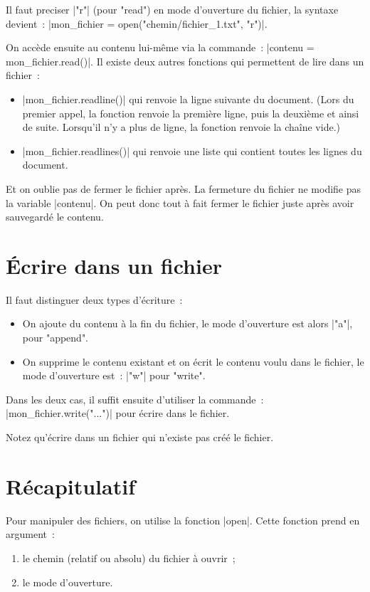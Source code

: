 	Il faut preciser \python|"r"| (pour "read") en mode d'ouverture du fichier, la syntaxe devient~: \python|mon_fichier = open("chemin/fichier_1.txt", "r")|.
	
	On accède ensuite au contenu lui-même via la commande~: \python|contenu = mon_fichier.read()|. Il existe deux autres fonctions qui permettent de lire dans un fichier~:
	\begin{itemize}
		\item \python|mon_fichier.readline()| qui renvoie la ligne suivante du document. (Lors du premier appel, la fonction renvoie la première ligne, puis la deuxième et ainsi de suite. Lorsqu'il n'y a plus de ligne, la fonction renvoie la chaîne vide.)
		\item \python|mon_fichier.readlines()| qui renvoie une liste qui contient toutes les lignes du document.
	\end{itemize}
	
	Et on oublie pas de fermer le fichier après. La fermeture du fichier ne modifie pas la variable \python|contenu|. On peut donc tout à fait fermer le fichier juste après avoir sauvegardé le contenu.

\section{Écrire dans un fichier}

	Il faut distinguer deux types d'écriture~:
	\begin{itemize}
		\item On ajoute du contenu à la fin du fichier, le mode d'ouverture est alors \python|"a"|, pour "append".
		\item On supprime le contenu existant et on écrit le contenu voulu dans le fichier, le mode d'ouverture est~: \python|"w"| pour "write".
	\end{itemize}
	
	Dans les deux cas, il suffit ensuite d'utiliser la commande~: \python|mon_fichier.write("...")| pour écrire dans le fichier.
	
	Notez qu'écrire dans un fichier qui n'existe pas créé le fichier.

\section{Récapitulatif}
	
	Pour manipuler des fichiers, on utilise la fonction \python|open|. Cette fonction prend en argument~:
	\begin{enumerate}
		\item le chemin (relatif ou absolu) du fichier à ouvrir~;
		\item le mode d'ouverture.
	\end{enumerate}
	

